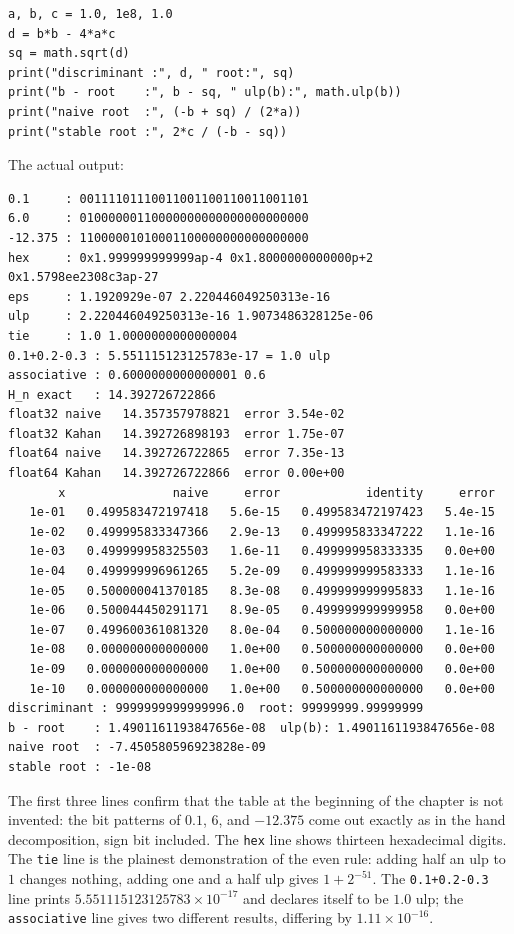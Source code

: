 \begin{lab}
\begin{verbatim}
a, b, c = 1.0, 1e8, 1.0
d = b*b - 4*a*c
sq = math.sqrt(d)
print("discriminant :", d, " root:", sq)
print("b - root    :", b - sq, " ulp(b):", math.ulp(b))
print("naive root  :", (-b + sq) / (2*a))
print("stable root :", 2*c / (-b - sq))
\end{verbatim}
The actual output:
\begin{verbatim}
0.1     : 00111101110011001100110011001101
6.0     : 01000000110000000000000000000000
-12.375 : 11000001010001100000000000000000
hex     : 0x1.999999999999ap-4 0x1.8000000000000p+2 0x1.5798ee2308c3ap-27
eps     : 1.1920929e-07 2.220446049250313e-16
ulp     : 2.220446049250313e-16 1.9073486328125e-06
tie     : 1.0 1.0000000000000004
0.1+0.2-0.3 : 5.551115123125783e-17 = 1.0 ulp
associative : 0.6000000000000001 0.6
H_n exact   : 14.392726722866
float32 naive   14.357357978821  error 3.54e-02
float32 Kahan   14.392726898193  error 1.75e-07
float64 naive   14.392726722865  error 7.35e-13
float64 Kahan   14.392726722866  error 0.00e+00
       x               naive     error            identity     error
   1e-01   0.499583472197418   5.6e-15   0.499583472197423   5.4e-15
   1e-02   0.499995833347366   2.9e-13   0.499995833347222   1.1e-16
   1e-03   0.499999958325503   1.6e-11   0.499999958333335   0.0e+00
   1e-04   0.499999996961265   5.2e-09   0.499999999583333   1.1e-16
   1e-05   0.500000041370185   8.3e-08   0.499999999995833   1.1e-16
   1e-06   0.500044450291171   8.9e-05   0.499999999999958   0.0e+00
   1e-07   0.499600361081320   8.0e-04   0.500000000000000   1.1e-16
   1e-08   0.000000000000000   1.0e+00   0.500000000000000   0.0e+00
   1e-09   0.000000000000000   1.0e+00   0.500000000000000   0.0e+00
   1e-10   0.000000000000000   1.0e+00   0.500000000000000   0.0e+00
discriminant : 9999999999999996.0  root: 99999999.99999999
b - root    : 1.4901161193847656e-08  ulp(b): 1.4901161193847656e-08
naive root  : -7.450580596923828e-09
stable root : -1e-08
\end{verbatim}
\end{lab}

The first three lines confirm that the table at the beginning of the chapter is not
invented: the bit patterns of $0.1$, $6$, and $-12.375$ come out exactly as in the hand
decomposition, sign bit included. The \texttt{hex} line shows thirteen hexadecimal
digits. The \texttt{tie} line is the plainest demonstration of the even rule: adding
half an ulp to $1$ changes nothing, adding one and a half ulp gives
$1+2^{-51}$. The \texttt{0.1+0.2-0.3} line prints
$5.551115123125783\times10^{-17}$ and declares itself to be $1.0$ ulp; the
\texttt{associative} line gives two different results, differing by
$1.11\times10^{-16}$.

